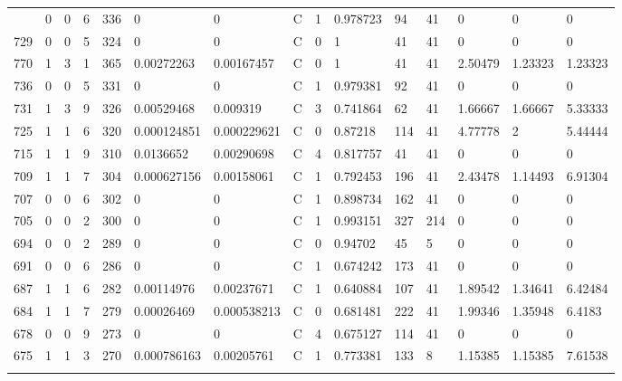 \begin{latin}
\begin{longtable}{lllllllllllllll}
\begin{comment}
	741 & 0  & 0   & 6  & 336 & 0              & 0              & C & 1  & 0.978723 & 94   & 41   & 0       & 0       & 0       \\
	729 & 0  & 0   & 5  & 324 & 0              & 0              & C & 0  & 1        & 41   & 41   & 0       & 0       & 0       \\
	770 & 1  & 3   & 1  & 365 & 0.00272263     & 0.00167457     & C & 0  & 1        & 41   & 41   & 2.50479 & 1.23323 & 1.23323 \\
	736 & 0  & 0   & 5  & 331 & 0              & 0              & C & 1  & 0.979381 & 92   & 41   & 0       & 0       & 0       \\
	731 & 1  & 3   & 9  & 326 & 0.00529468     & 0.009319       & C & 3  & 0.741864 & 62   & 41   & 1.66667 & 1.66667 & 5.33333 \\
	725 & 1  & 1   & 6  & 320 & 0.000124851    & 0.000229621    & C & 0  & 0.87218  & 114  & 41   & 4.77778 & 2       & 5.44444 \\
	715 & 1  & 1   & 9  & 310 & 0.0136652      & 0.00290698     & C & 4  & 0.817757 & 41   & 41   & 0       & 0       & 0       \\
	709 & 1  & 1   & 7  & 304 & 0.000627156    & 0.00158061     & C & 1  & 0.792453 & 196  & 41   & 2.43478 & 1.14493 & 6.91304 \\
	707 & 0  & 0   & 6  & 302 & 0              & 0              & C & 1  & 0.898734 & 162  & 41   & 0       & 0       & 0       \\
	705 & 0  & 0   & 2  & 300 & 0              & 0              & C & 1  & 0.993151 & 327  & 214  & 0       & 0       & 0       \\
	694 & 0  & 0   & 2  & 289 & 0              & 0              & C & 0  & 0.94702  & 45   & 5    & 0       & 0       & 0       \\
	691 & 0  & 0   & 6  & 286 & 0              & 0              & C & 1  & 0.674242 & 173  & 41   & 0       & 0       & 0       \\
	687 & 1  & 1   & 6  & 282 & 0.00114976     & 0.00237671     & C & 1  & 0.640884 & 107  & 41   & 1.89542 & 1.34641 & 6.42484 \\
	684 & 1  & 1   & 7  & 279 & 0.00026469     & 0.000538213    & C & 0  & 0.681481 & 222  & 41   & 1.99346 & 1.35948 & 6.4183  \\
	678 & 0  & 0   & 9  & 273 & 0              & 0              & C & 4  & 0.675127 & 114  & 41   & 0       & 0       & 0       \\
	675 & 1  & 1   & 3  & 270 & 0.000786163    & 0.00205761     & C & 1  & 0.773381 & 133  & 8    & 1.15385 & 1.15385 & 7.61538 \\

\end{comment}
\end{longtable}
\end{latin}
